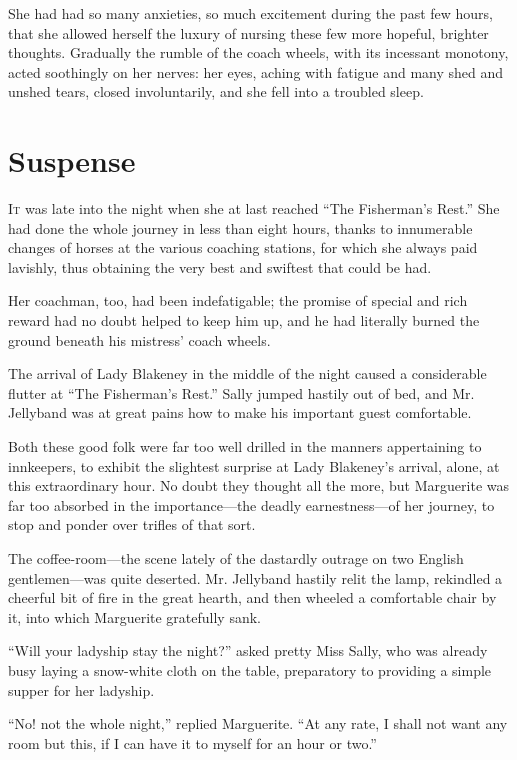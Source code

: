 \documentclass[paper=5.5in:8.5in,BCOR=7mm,twoside,DIV=calc,12pt,usegeometry,chapterprefix,endperiod,headings=big]{scrbook}
\begin{document}
She had had so many anxieties, so much excitement during the past few hours, that she allowed herself the luxury of nursing these few more hopeful, brighter thoughts. Gradually the rumble of the coach wheels, with its incessant monotony, acted soothingly on her nerves: her eyes, aching with fatigue and many shed and unshed tears, closed involuntarily, and she fell into a troubled sleep.

\chapter{Suspense}
\lettrine[lines=4]{I}{t} was late into the night when she at last reached \enquote{The Fisherman's Rest.} She had done the whole journey in less than eight hours, thanks to innumerable changes of horses at the various coaching stations, for which she always paid lavishly, thus obtaining the very best and swiftest that could be had.

Her coachman, too, had been indefatigable; the promise of special and rich reward had no doubt helped to keep him up, and he had literally burned the ground beneath his mistress’ coach wheels.

The arrival of Lady Blakeney in the middle of the night caused a considerable flutter at \enquote{The Fisherman's Rest.} Sally jumped hastily out of bed, and Mr. Jellyband was at great pains how to make his important guest comfortable.

Both these good folk were far too well drilled in the manners appertaining to innkeepers, to exhibit the slightest surprise at Lady Blakeney's arrival, alone, at this extraordinary hour. No doubt they thought all the more, but Marguerite was far too absorbed in the importance---the deadly earnestness---of her journey, to stop and ponder over trifles of that sort.

The coffee-room---the scene lately of the dastardly outrage on two English gentlemen---was quite deserted. Mr. Jellyband hastily relit the lamp, rekindled a cheerful bit of fire in the great hearth, and then wheeled a comfortable chair by it, into which Marguerite gratefully sank.

\enquote{Will your ladyship stay the night?} asked pretty Miss Sally, who was already busy laying a snow-white cloth on the table, preparatory to providing a simple supper for her ladyship.

\enquote{No! not the whole night,} replied Marguerite. \enquote{At any rate, I shall not want any room but this, if I can have it to myself for an hour or two.}
\end{document}
